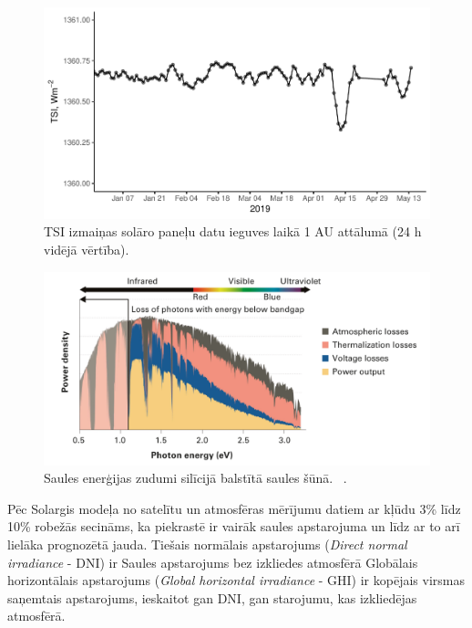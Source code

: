 \begin{figure}[h]
    \centering
    \includegraphics[width=\linewidth]{figures/misc/TSI.pdf}
    \caption{TSI izmaiņas solāro paneļu datu ieguves laikā 1 AU attālumā (24 h vidējā vērtība)\cite{TSIdata}.}
    \label{fig:TSI2}
\end{figure}


\begin{figure}[h]
    \centering
    \includegraphics[width=\linewidth]{figures/misc/energyLosses.png}
    \caption{Saules enerģijas zudumi silīcijā balstītā saules šūnā.  ~\cite{Sivaram}.}
    \label{fig:zudumi}
\end{figure}


Pēc Solargis modeļa no satelītu un atmosfēras mērījumu datiem ar kļūdu 3\% līdz 10\% robežās secināms, ka piekrastē ir vairāk saules apstarojuma un līdz ar to arī lielāka prognozētā jauda. 
Tiešais normālais apstarojums (\textit{Direct normal irradiance} - DNI) ir Saules apstarojums bez izkliedes atmosfērā
Globālais horizontālais apstarojums (\textit{Global horizontal irradiance} - GHI) ir kopējais virsmas saņemtais apstarojums, ieskaitot gan DNI, gan starojumu, kas izkliedējas atmosfērā.

